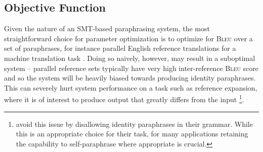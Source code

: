\documentclass[11pt]{article}
\begin{document}

\subsection{Objective Function}

Given the nature of an SMT-based paraphrasing system, the most
straightforward choice for parameter optimization is to optimize for
\textsc{Bleu} over a set of paraphrases, for instance parallel English
reference translations for a machine translation task
\cite{Madnani2007}. Doing so naively, however, may result in a
suboptimal system -- parallel reference sets typically have very high
inter-reference \textsc{Bleu} score and so the system will be heavily
biased towards producing identity paraphrases. This can severely hurt
system performance on a task such as reference expansion, where it is
of interest to produce output that greatly differs from the input
\footnote{ avoid this issue by disallowing
  identity paraphrases in their grammar. While this is an appropriate
  choice for their task, for many applications retaining the
  capability to self-paraphrase where appropriate is crucial.}.
\end{document}
